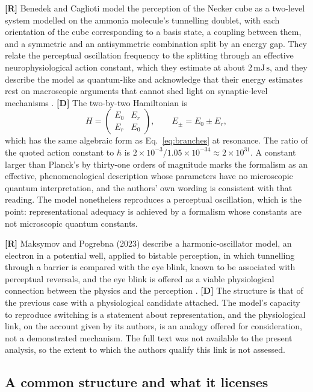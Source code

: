 \documentclass[11pt]{article}
\newcommand{\stR}{\textbf{\textcolor{blue!55!black}{[R]}}}
\newcommand{\stD}{\textbf{\textcolor{green!40!black}{[D]}}}
\theoremstyle{plain}
\theoremstyle{definition}
\theoremstyle{remark}
\begin{document}
\stR{} Benedek and Caglioti model the perception of the Necker cube as a two-level system modelled on the ammonia molecule's tunnelling doublet, with each orientation of the cube corresponding to a basis state, a coupling between them, and a symmetric and an antisymmetric combination split by an energy gap. They relate the perceptual oscillation frequency to the splitting through an effective neurophysiological action constant, which they estimate at about $2\,\mathrm{mJ\,s}$, and they describe the model as quantum-like and acknowledge that their energy estimates rest on macroscopic arguments that cannot shed light on synaptic-level mechanisms \cite{benedek2019}. \stD{} The two-by-two Hamiltonian is
\begin{equation}
H=\begin{pmatrix}E_0&E_r\\E_r&E_0\end{pmatrix},\qquad E_\pm=E_0\pm E_r,
\label{eq:necker}
\end{equation}
which has the same algebraic form as Eq.~\eqref{eq:branches} at resonance. The ratio of the quoted action constant to $\hbar$ is $2\times10^{-3}/1.05\times10^{-34}\approx2\times10^{31}$. A constant larger than Planck's by thirty-one orders of magnitude marks the formalism as an effective, phenomenological description whose parameters have no microscopic quantum interpretation, and the authors' own wording is consistent with that reading. The model nonetheless reproduces a perceptual oscillation, which is the point: representational adequacy is achieved by a formalism whose constants are not microscopic quantum constants.

\stR{} Maksymov and Pogrebna (2023) describe a harmonic-oscillator model, an electron in a potential well, applied to bistable perception, in which tunnelling through a barrier is compared with the eye blink, known to be associated with perceptual reversals, and the eye blink is offered as a viable physiological connection between the physics and the perception \cite{maksymov2023b}. \stD{} The structure is that of the previous case with a physiological candidate attached. The model's capacity to reproduce switching is a statement about representation, and the physiological link, on the account given by its authors, is an analogy offered for consideration, not a demonstrated mechanism. The full text was not available to the present analysis, so the extent to which the authors qualify this link is not assessed.

\subsection{A common structure and what it licenses}
\end{document}
